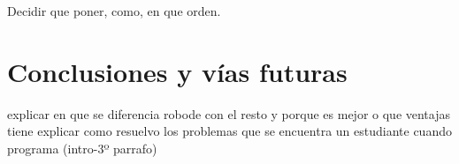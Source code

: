 {\color{green}
Decidir que poner, como, en que orden.
}



\chapter{Conclusiones y vías futuras}\label{conslusiones}




{\color{blue}
explicar en que se diferencia robode con el resto y porque es mejor o que ventajas tiene
explicar como resuelvo los problemas que se encuentra un estudiante cuando programa (intro-3º parrafo)
}
